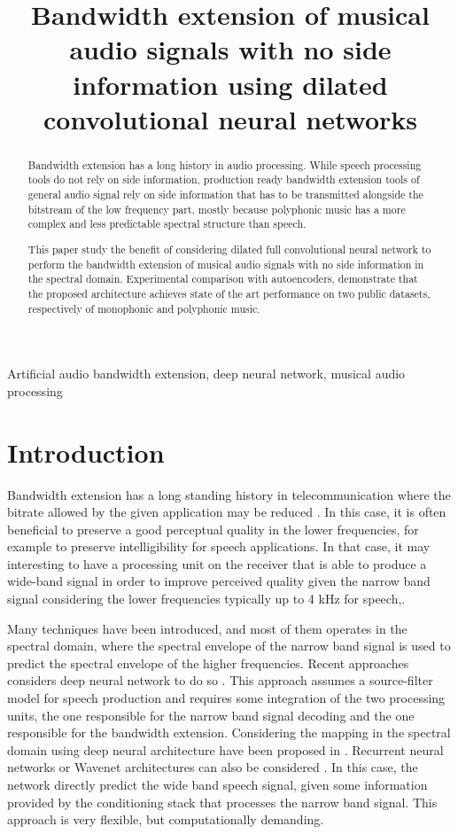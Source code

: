 \documentclass{article}
\title{Bandwidth extension of musical audio signals with no side information using dilated convolutional neural networks}
\begin{document}
%
\maketitle
%
\begin{abstract}

Bandwidth extension has a long history in audio processing. While speech processing tools do not rely on side information, production ready bandwidth extension tools of general audio signal rely on side information that has to be transmitted alongside the bitstream of the low frequency part, mostly because polyphonic music has a more complex and less predictable spectral structure than speech.

This paper study the benefit of considering dilated full convolutional neural network to perform the bandwidth extension of musical audio signals with no side information in the spectral domain. Experimental comparison with autoencoders, demonstrate that the proposed architecture achieves state of the art performance on two public datasets, respectively of monophonic and polyphonic music.


\end{abstract}
%
\begin{keywords}
Artificial audio bandwidth extension, deep neural network, musical audio processing
\end{keywords}
%
\section{Introduction}
\label{sec:intro}

Bandwidth extension has a long standing history in telecommunication where the bitrate allowed by the given application may be reduced \cite{larsen2005audio}. In this case, it is often beneficial to preserve a good perceptual quality in the lower frequencies, for example to preserve intelligibility for speech applications. In that case, it may interesting to have a processing unit on the receiver that is able to produce a wide-band signal in order to improve perceived quality given the narrow band signal considering the lower frequencies typically up to 4 kHz for speech,.

Many techniques have been introduced, and most of them operates in the spectral domain, where the spectral envelope of the narrow band signal is used to predict the spectral envelope of the higher frequencies. Recent approaches considers deep neural network to do so \cite{abel2017artificial}. This approach assumes a source-filter model for speech production and requires some integration of the two processing units, the one responsible for the narrow band signal decoding and the one responsible for the bandwidth extension. Considering the mapping in the spectral domain using deep neural architecture have been proposed in \cite{li2015deep}. Recurrent neural networks \cite{ling2018waveform} or Wavenet architectures can also be considered \cite{gupta2019speech}. In this case, the network directly predict the wide band speech signal, given some information provided by the conditioning stack that processes the narrow band signal. This approach is very flexible, but computationally demanding.
\end{document}
